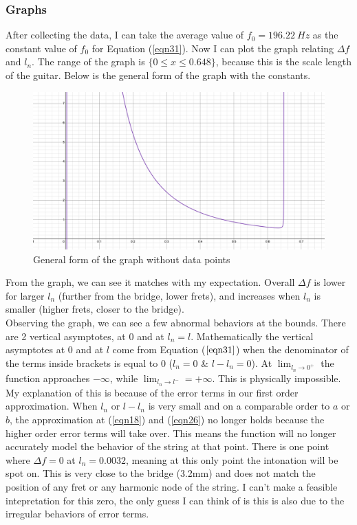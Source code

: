 \documentclass[11pt]{article}
\begin{document}
\begin{flushleft}
            \subsubsection*{Graphs}    
                After collecting the data, I can take the average value of $f_0 = \SI{196.22}{Hz}$ as the constant value of $f_0$ for Equation (\ref{eqn31}). Now I can plot the graph relating $\Delta f$ and $l_n$. The range of the graph is $\{0 \le x \le 0.648 \}$, because this is the scale length of the guitar. Below is the general form of the graph with the constants. \\
                \begin{figure}[h!]
                    \includegraphics[width = \textwidth]{no_data_graph.png}
                    \caption{General form of the graph without data points} \label{fig8}
                \end{figure}
                From the graph, we can see it matches with my expectation. Overall $\Delta f$ is lower for larger $l_n$ (further from the bridge, lower frets), and increases when $l_n$ is smaller (higher frets, closer to the bridge). \\
                Observing the graph, we can see a few abnormal behaviors at the bounds. There are 2 vertical asymptotes, at 0 and at $l_n = l$. Mathematically the vertical asymptotes at 0 and at $l$ come from Equation ($\ref{eqn31}$) when the denominator of the terms inside brackets is equal to 0 ($l_n = 0$ \& $l-l_n = 0$). At $\lim_{l_n \to 0^+}$ the function approaches $-\infty$, while $\lim_{l_n \to l^-} = +\infty$. This is physically impossible. My explanation of this is because of the error terms in our first order approximation. When $l_n$ or $l-l_n$ is very small and on a comparable order to $a$ or $b$, the approximation at (\ref{eqn18}) and (\ref{eqn26}) no longer holds because the higher order error terms will take over. This means the function will no longer accurately model the behavior of the string at that point. There is one point where $\Delta f = 0$ at $l_n = 0.0032$, meaning at this only point the intonation will be spot on. This is very close to the bridge (3.2mm) and does not match the position of any fret or any harmonic node of the string. I can't make a feasible intepretation for this zero, the only guess I can think of is this is also due to the irregular behaviors of error terms. \\

\end{flushleft}
\end{document}
